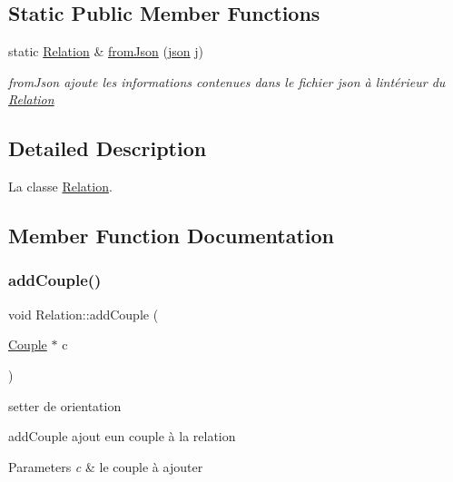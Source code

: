 \subsection*{Static Public Member Functions}
\begin{DoxyCompactItemize}
\item 
static \hyperlink{classRelation}{Relation} \& \hyperlink{classRelation_acc9e6208d259046727368abb0bdbc09c}{from\+Json} (\hyperlink{classnlohmann_1_1basic__json}{json} j)
\begin{DoxyCompactList}\small\item\em from\+Json ajoute les informations contenues dans le fichier json à l\textquotesingle{}intérieur du \hyperlink{classRelation}{Relation} \end{DoxyCompactList}\end{DoxyCompactItemize}


\subsection{Detailed Description}
La classe \hyperlink{classRelation}{Relation}. 

\subsection{Member Function Documentation}
\mbox{\label{classRelation_a773220ed96bf384a04f9019eaae81fc7}} 
\subsubsection{\texorpdfstring{add\+Couple()}{addCouple()}}
{\footnotesize\ttfamily void Relation\+::add\+Couple (\begin{DoxyParamCaption}\item[{\hyperlink{classCouple}{Couple} $\ast$}]{c }\end{DoxyParamCaption})}



setter de orientation 

add\+Couple ajout eun couple à la relation 
\begin{DoxyParams}{Parameters}
{\em c} & le couple à ajouter \\
\hline
\end{DoxyParams}
\mbox{\label{classRelation_a31495362066e4fb9a98d4a163a7bbfc7}} 

